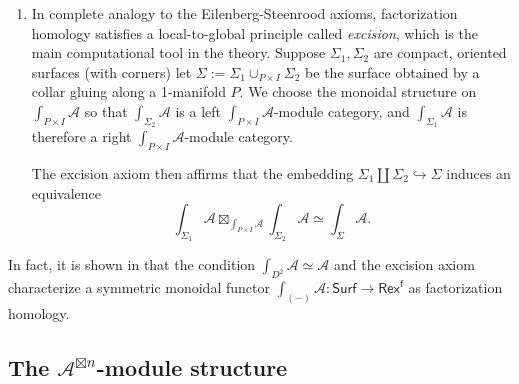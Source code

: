 \documentclass[11pt]{article}
\newcommand{\cA}{\mathcal{A}}
\theoremstyle{definition}
\begin{document}
\begin{enumerate}[label=(\arabic*)]
\item In complete analogy to the Eilenberg-Steenrood axioms, factorization homology satisfies a local-to-global principle called \emph{excision}, which is the main computational tool in the theory. Suppose $\Sigma_1, \Sigma_2$ are compact, oriented surfaces (with corners) let $\Sigma:= \Sigma_1 \cup_{P \times I} \Sigma_2$ be the surface obtained by a collar gluing along a 1-manifold $P$.  We choose the monoidal structure on  $\int_{P \times I} \mathcal{A}$ so that $\int_{\Sigma_2} \mathcal{A}$ is a   left $\int_{P \times I} \mathcal{A}$-module category, and   $\int_{\Sigma_1} \mathcal{A}$ is therefore a  right $\int_{P \times I} \mathcal{A}$-module category.


The excision axiom then affirms that the embedding $\Sigma_1 \amalg \Sigma_2 \hookrightarrow \Sigma$ induces an equivalence
\begin{equation}\label{eq:excision}
\int_{\Sigma_1} \mathcal{A} \boxtimes_{\int_{P \times I} \mathcal{A} } \int_{\Sigma_2} \mathcal{A} \simeq \int_{\Sigma} \mathcal{A}.
\end{equation}
\end{enumerate}


In fact, it is shown in \cite[\S 3.3]{AF} that the condition $\int_{D^2} \mathcal{A} \simeq \mathcal{A}$ and the excision axiom characterize a symmetric monoidal functor $\int_{(-)} \mathcal{A} : \mathsf{Surf} \longrightarrow \mathsf{Rex}^\mathsf{f}$ as factorization homology.  






\subsection{The \texorpdfstring{$\mathcal{A}^{\boxtimes n}$}{A^n}-module structure}
\end{document}
